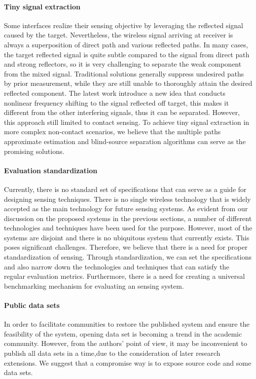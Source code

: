 \paragraph*{Tiny signal extraction} Some interfaces realize their sensing objective by leveraging the reflected signal caused by the
target. Nevertheless, the wireless signal arriving at receiver is always a superposition of  direct path and various reflected paths. In
many cases, the target reflected signal is quite subtle compared to the signal from direct path and strong reflectors, so it is very
challenging to separate the weak component from the mixed signal. Traditional solutions generally suppress undesired paths by prior
measurement, while they are still unable to thoroughly attain the desired reflected component. The latest work introduce a new idea that
conducts nonlinear frequency shifting to the signal reflected off target, this makes it different from the other interfering signals, thus
it can be separated. However, this approach still limited to contact sensing. To achieve tiny signal extraction in more complex non-contact
scenarios, we believe that the multiple paths approximate estimation and blind-source separation algorithms can serve as the promising
solutions.

\paragraph*{Evaluation standardization} Currently, there is no standard set of specifications that can serve as a guide for designing
sensing techniques. There is no single wireless technology that is widely accepted as the main technology for future sensing systems. As
evident from our discussion on the proposed systems in the previous sections, a number of different technologies and techniques have been
used for the purpose. However, most of the systems are disjoint and there is no ubiquitous system that currently exists. This poses
significant challenges. Therefore, we believe that there is a need for proper standardization of sensing. Through standardization, we can
set the specifications and also narrow down the technologies and techniques that can satisfy the regular evaluation metrics. Furthermore,
there is a need for creating a universal benchmarking mechanism for evaluating an sensing system.

\paragraph*{Public data sets} In order to facilitate communities to restore the published system and ensure the feasibility of the system,
opening data set is becoming a trend in the academic community. However, from the authors' point of view, it may be inconvenient to publish
all data sets in a time,due to the consideration of later research extensions. We suggest that a compromise way is to expose source code
and some data sets.
